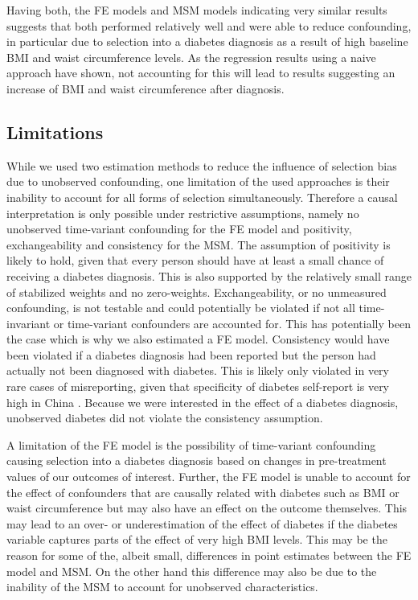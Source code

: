 Having both, the \ac{FE} models and \ac{MSM} models indicating very similar results suggests that both performed relatively well and were able to reduce confounding, in particular due to selection into a diabetes diagnosis as a result of high baseline \ac{BMI} and waist circumference levels. As the regression results using a naive approach have shown, not accounting for this will lead to results suggesting an increase of \ac{BMI} and waist circumference after diagnosis. 

\subsection{Limitations}

While we used two estimation methods to reduce the influence of selection bias due to unobserved confounding, one limitation of the used approaches is their inability to account for all forms of selection simultaneously. Therefore a causal interpretation is only possible under restrictive assumptions, namely no unobserved time-variant confounding for the \ac{FE} model and positivity, exchangeability and consistency for the \ac{MSM}. The assumption of positivity is likely to hold, given that every person should have at least a small chance of receiving a diabetes diagnosis. This is also supported by the relatively small range of stabilized weights and no zero-weights. Exchangeability, or no unmeasured confounding, is not testable and could potentially be violated if not all time-invariant or time-variant confounders are accounted for. This has potentially been the case which is why we also estimated a \ac{FE} model. Consistency would have been violated if a diabetes diagnosis had been reported but the person had actually not been diagnosed with diabetes. This is likely only violated in very rare cases of misreporting, given that specificity of diabetes self-report is very high in China \autocite{Yuan2015}. Because we were interested in the effect of a diabetes diagnosis, unobserved diabetes did not violate the consistency assumption.

A limitation of the \ac{FE} model is the possibility of time-variant confounding causing selection into a diabetes diagnosis based on changes in pre-treatment values of our outcomes of interest. Further, the \ac{FE} model is unable to account for the effect of confounders that are causally related with diabetes such as \ac{BMI} or waist circumference but may also have an effect on the outcome themselves. This may lead to an over- or underestimation of the effect of diabetes if the diabetes variable captures parts of the effect of very high \ac{BMI} levels. This may be the reason for some of the, albeit small, differences in point estimates between the \ac{FE} model and \ac{MSM}. On the other hand this difference may also be due to the inability of the \ac{MSM} to account for unobserved characteristics.


